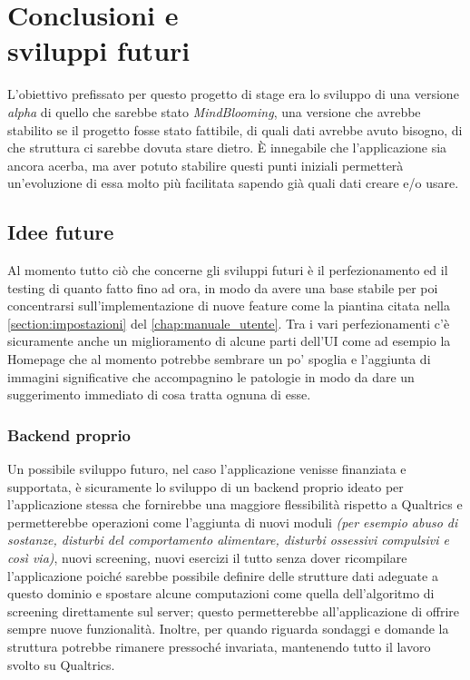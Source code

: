 \chapter[Conclusioni e sviluppi futuri]{Conclusioni e\\sviluppi futuri}
L'obiettivo prefissato per questo progetto di stage era lo sviluppo di una versione \textit{alpha} di quello che sarebbe stato \textit{MindBlooming}, una versione che avrebbe stabilito se il progetto fosse stato fattibile, di quali dati avrebbe avuto bisogno, di che struttura ci sarebbe dovuta stare dietro. È innegabile che l'applicazione sia ancora acerba, ma aver potuto stabilire questi punti iniziali permetterà un'evoluzione di essa molto più facilitata sapendo già quali dati creare e/o usare.

\section{Idee future}
Al momento tutto ciò che concerne gli sviluppi futuri è il perfezionamento ed il testing di quanto fatto fino ad ora, in modo da avere una base stabile per poi concentrarsi sull'implementazione di nuove feature come la piantina citata nella \autoref{section:impostazioni} del \autoref{chap:manuale_utente}.
Tra i vari perfezionamenti c'è sicuramente anche un miglioramento di alcune parti dell'UI come ad esempio la Homepage che al momento potrebbe sembrare un po' spoglia e l'aggiunta di immagini significative che accompagnino le patologie in modo da dare un suggerimento immediato di cosa tratta ognuna di esse.

\subsection{Backend proprio}
Un possibile sviluppo futuro, nel caso l'applicazione venisse finanziata e supportata, è sicuramente lo sviluppo di un backend proprio ideato per l'applicazione stessa che fornirebbe una maggiore flessibilità rispetto a Qualtrics e permetterebbe operazioni come l'aggiunta di nuovi moduli \textit{(per esempio abuso di sostanze, disturbi del comportamento alimentare, disturbi ossessivi compulsivi e così via)}, nuovi screening, nuovi esercizi il tutto senza dover ricompilare l'applicazione poiché sarebbe possibile definire delle strutture dati adeguate a questo dominio e spostare alcune computazioni come quella dell'algoritmo di screening direttamente sul server; questo permetterebbe all'applicazione di offrire sempre nuove funzionalità. Inoltre, per quando riguarda sondaggi e domande la struttura potrebbe rimanere pressoché invariata, mantenendo tutto il lavoro svolto su Qualtrics.

